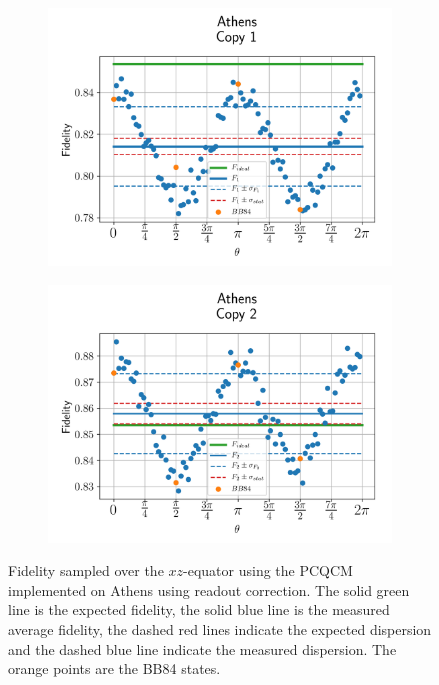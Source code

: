 \begin{figure}[H]
  \centering
  \begin{subfigure}{.5\textwidth}
    \centering
    \includegraphics[width=\textwidth]{Figures/PhaseCovariant/IBM/OnlyEquator/results_corrected_athens_copy1.png}
    \label{fig:pc_corrected_athens_equator_1}
  \end{subfigure}%
  \begin{subfigure}{.5\textwidth}
    \centering
    \includegraphics[width=\textwidth]{Figures/PhaseCovariant/IBM/OnlyEquator/results_corrected_athens_copy2.png}
    \label{fig:pc_corrected_athens_equator_2}
  \end{subfigure}
  \vspace{-0.5cm}
  \caption{Fidelity sampled over the $xz$-equator using the PCQCM implemented on Athens using readout correction. The solid green line is the expected fidelity, the solid blue line is the measured average fidelity, the dashed red lines indicate the expected dispersion and the dashed blue line indicate the measured dispersion. The orange points are the BB84 states.}
  \label{fig:pc_corrected_athens_equator}
\end{figure}


